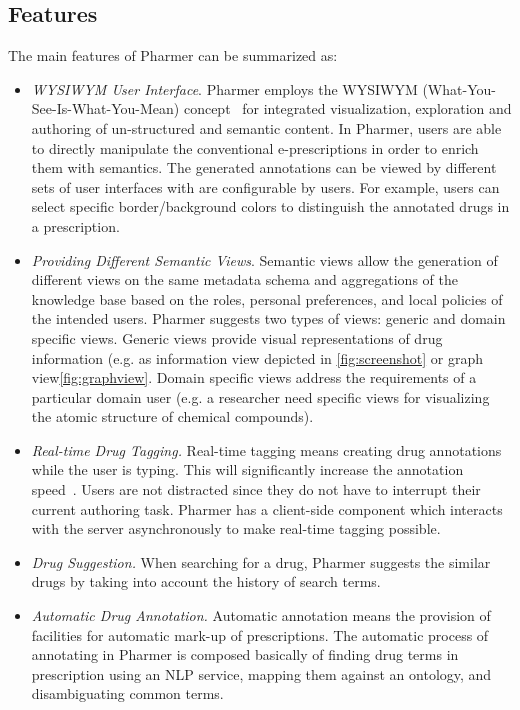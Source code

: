 \documentclass[conference]{IEEEtran}
\begin{document}
\subsection{Features}
The main features of Pharmer can be summarized as:
\begin{itemize}
    \item \emph{WYSIWYM User Interface}.
    Pharmer employs the WYSIWYM (What-You-See-Is-What-You-Mean) concept~\cite{wysiwym} for integrated visualization, exploration and authoring of un-structured and semantic content.
    In Pharmer, users are able to directly manipulate the conventional e-prescriptions in order to enrich them with semantics.
    The generated annotations can be viewed by different sets of user interfaces with are configurable by users.
    For example, users can select specific border/background colors to distinguish the annotated drugs in a prescription.
	\item \emph{Providing Different Semantic Views}.
	Semantic views allow the generation of different views on the same metadata schema and aggregations of the knowledge base based on the roles, personal preferences, and local policies of the intended users.
	Pharmer suggests two types of views: generic and domain specific views.
	Generic views provide visual representations of drug information (e.g. as information view depicted in \autoref{fig:screenshot} or graph view\autoref{fig:graphview}.
	Domain specific views address the requirements of a particular domain user (e.g. a researcher need specific views for visualizing the atomic structure of chemical compounds).
	\item \emph{Real-time Drug Tagging.}
	Real-time tagging means creating drug annotations while the user is typing.
	This will significantly increase the annotation speed~\cite{OCA}.
	Users are not distracted since they do not have to interrupt their current authoring task.
	Pharmer has a client-side component which interacts with the server asynchronously to make real-time tagging possible.
	\item \emph{Drug Suggestion.}
		When searching for a drug, Pharmer suggests the similar drugs by taking into account the history of search terms.
    \item \emph{Automatic Drug Annotation.}
    Automatic annotation means the provision of facilities for automatic mark-up of prescriptions.
    The automatic process of annotating in Pharmer is composed basically of finding drug terms in prescription using an NLP service, mapping them against an ontology, and disambiguating common terms.
\end{itemize}
\end{document}
